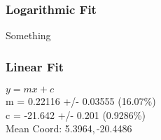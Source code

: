 \documentclass{article}
\begin{document}
		\subsubsection{Logarithmic Fit}
			\begin{minipage}[h]{0.6\textwidth}
					\begin{center}
						\begingroup{}
			  			\resizebox{\textwidth}{!}{%
							
			  			}\endgroup
					\end{center}
			\end{minipage}
			\begin{minipage}[h]{0.35\textwidth}
			Something
			\end{minipage}

		\subsubsection{Linear Fit}
			\begin{minipage}[h]{0.6\textwidth}
					\begin{center}
						\begingroup{}
			  			\resizebox{\textwidth}{!}{%
							
			  			}\endgroup
					\end{center}
			\end{minipage}
			\begin{minipage}[h]{0.35\textwidth}
				$y=mx+c$ \\
				m               = 0.22116          +/- 0.03555      (16.07\%) \\
				c               = -21.642          +/- 0.201        (0.9286\%) \\

				Mean Coord: 5.3964,\,-20.4486
			\end{minipage}
\end{document}
